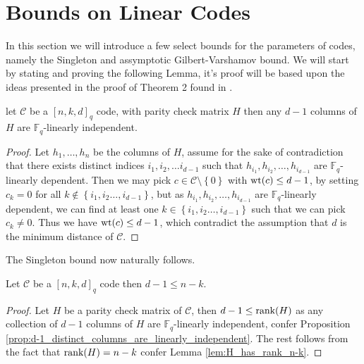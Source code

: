 \section{Bounds on Linear Codes}\label{sec:bounds}
In this section we will introduce a few select bounds for the parameters of codes, namely the Singleton and assymptotic Gilbert-Varshamov bound. We will start by stating and proving the following Lemma, it's proof will be based upon the ideas presented in the proof of Theorem 2 found in \cite{the_singleton_bound_and_rs_code}.

\begin{proposition}\label{prop:d-1_distinct_columns_are_linearly_independent}
  let $\mathcal{C}$ be a $[n, k, d]_q$ code, with parity check matrix $H$ then any $d-1$ columns of $H$ are $\mathbb{F}_{q}$-linearly independent.
\end{proposition}

\begin{proof}
  Let $h_1, \ldots, h_n$ be the columns of $H$, assume for the sake of contradiction that there exists distinct indices $i_1, i_2, \ldots i_{d-1}$ such that $h_{i_{1}}, h_{i_{2}}, \ldots, h_{i_{d-1}}$ are $\mathbb{F}_{q}$-linearly dependent.
  Then we may pick $c \in \mathcal{C} \setminus \left\{0\right\}$ with $\mathrm{wt}(c) \leq d - 1$, by setting $c_{k} = 0$ for all $k \not \in \left\{i_1, i_2 \ldots, i_{d-1}\right\}$, but as $h_{i_{1}}, h_{i_{2}}, \ldots, h_{i_{d-1}}$ are $\mathbb{F}_{q}$-linearly dependent, we can find at least one $k \in \left\{i_1, i_2 \ldots, i_{d-1}\right\}$ such that we can pick $c_k \neq 0$.
  Thus we have $\mathrm{wt}(c) \leq d - 1$, which contradict the assumption that $d$ is the minimum distance of $\mathcal{C}$.
\end{proof}

The Singleton bound now naturally follows.

\begin{corollary}\label{cor:singleton_bound}
  Let $\mathcal{C}$ be a $[n, k, d]_q$ code then $d-1 \leq n - k$.
\end{corollary}

\begin{proof}
  Let $H$ be a parity check matrix of $\mathcal{C}$, then $d - 1 \leq \textnormal{rank}(H)$ as any collection of $d-1$ columns of $H$ are $\mathbb{F}_{q}$-linearly independent, confer Proposition \ref{prop:d-1_distinct_columns_are_linearly_independent}. The rest follows from the fact that $\textnormal{rank}(H) = n -k $ confer Lemma \ref{lem:H_has_rank_n-k}.
\end{proof}

